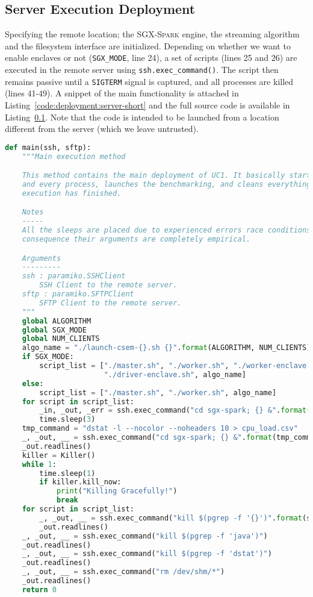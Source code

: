 \subsection{Server Execution Deployment} \label{sec:deployment:server}

Specifying the remote location; the \textsc{SGX-Spark} engine, the streaming algorithm and the filesystem interface are initialized. 
Depending on whether we want to enable enclaves or not (\texttt{SGX\_MODE}, line 24), a set of scripts (lines 25 and 26) are executed in the remote server using \texttt{ssh.exec\_command()}.
The script then remains passive until a \texttt{SIGTERM} signal is captured, and all processes are killed (lines 41-49).
A snippet of the main functionality is attached in Listing~\ref{code:deployment:server-short} and the full source code is available in Listing~\ref{sec:deployment:server}.
Note that the code is intended to be launched from a location different from the server (which we leave untrusted).

\begin{lstlisting}[language=Python,caption={Main method of the Server-Side Deployment Script.},label=code:deployment:server-short]
def main(ssh, sftp):
    """Main execution method

    This method contains the main deployment of UC1. It basically starts each
    and every process, launches the benchmarking, and cleans everything when
    execution has finished.

    Notes
    -----
    All the sleeps are placed due to experienced errors race conditions. As a
    consequence their arguments are completely empirical.

    Arguments
    ---------
    ssh : paramiko.SSHClient
        SSH Client to the remote server.
    sftp : paramiko.SFTPClient
        SFTP Client to the remote server.
    """
    global ALGORITHM
    global SGX_MODE
    global NUM_CLIENTS
    algo_name = "./launch-csem-{}.sh {}".format(ALGORITHM, NUM_CLIENTS)
    if SGX_MODE:
        script_list = ["./master.sh", "./worker.sh", "./worker-enclave.sh",
                       "./driver-enclave.sh", algo_name]
    else:
        script_list = ["./master.sh", "./worker.sh", algo_name]
    for script in script_list:
        _in, _out, _err = ssh.exec_command("cd sgx-spark; {} &".format(script))
        time.sleep(3)
    tmp_command = "dstat -l --nocolor --noheaders 10 > cpu_load.csv"
    _, _out, __ = ssh.exec_command("cd sgx-spark; {} &".format(tmp_command))
    _out.readlines()
    killer = Killer()
    while 1:
        time.sleep(1)
        if killer.kill_now:
            print("Killing Gracefully!")
            break
    for script in script_list:
        _, _out, __ = ssh.exec_command("kill $(pgrep -f '{}')".format(script))
        _out.readlines()
    _, _out, __ = ssh.exec_command("kill $(pgrep -f 'java')")
    _out.readlines()
    _, _out, __ = ssh.exec_command("kill $(pgrep -f 'dstat')")
    _out.readlines()
    _, _out, __ = ssh.exec_command("rm /dev/shm/*")
    _out.readlines()
    return 0
\end{lstlisting}

